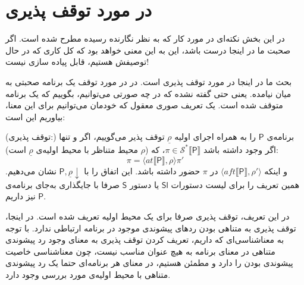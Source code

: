 \section{در مورد توقف پذیری}

در این بخش نکته‌ای در مورد کار که به نظر نگارنده رسیده مطرح شده است. اگر صحبت ما در اینجا درست باشد، این به این معنی خواهد بود که کل کاری که در حال توصیفش هستیم، قابل پیاده سازی نیست!

بحث ما در اینجا در مورد توقف پذیری است. در \cite{calcul} در مورد توقف یک برنامه صحبتی به میان نیامده. یعنی حتی گفته نشده که در چه صورتی می‌توانیم، بگوییم که یک برنامه متوقف شده است. یک تعریف  صوری معقول که خودمان می‌توانیم برای این معنا، بیاوریم این است:

\begin{defn}
(توقف پذیری:) برنامه‌ی $\mathsf{P}$ را به همراه اجرای اولیه $\underline{\rho}$ توقف پذیر می‌گوییم، اگر و تنها اگر وجود داشته باشد 
	$\pi \in \mathcal{S}^* \llbracket \mathsf{P} \rrbracket$، 
	که ($\rho$ محیط متناظر با محیط اولیه‌ی $\underline{\rho}$ است):
	$$\pi = \langle at \llbracket \mathsf{P} \rrbracket , \rho \rangle \pi'$$
	و اینکه $\langle aft\llbracket \mathsf{P} \rrbracket , \rho' \rangle$ در $\pi$ حضور داشته باشد. این اتفاق را با 
	$\mathsf{P,\underline{\rho}\downarrow}$
	نشان می‌دهیم. همین تعریف را برای لیست دستورات $\mathsf{Sl}$ یا دستور $\mathsf{S}$ صرفا با جایگذاری به‌جای برنامه‌ی $\mathsf{P}$ نیز داریم.
\end{defn} 
در این تعریف، توقف پذیری صرفا برای یک محیط اولیه تعریف شده است.
در اینجا، توقف پذیری به متناهی بودن ردهای پیشوندی موجود در برنامه ارتباطی ندارد. با توجه به معناشناسی‌ای که داریم، تعریف کردن توقف پذیری به معنای وجود رد پیشوندی متناهی در معنای برنامه به هیچ عنوان مناسب نیست، چون معناشناسی خاصیت پیشوندی بودن را دارد و مطمئن هستیم، در معنای هر برنامه‌ای حتما یک رد پیشوندی متناهی با محیط اولیه‌ی مورد بررسی وجود دارد.

